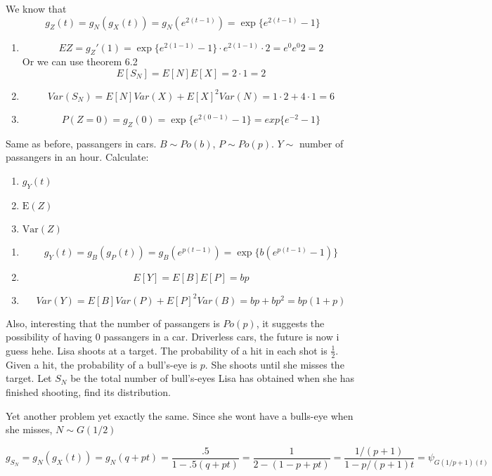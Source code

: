 \begin{enumerate}[label=(\alph*)]
\solution
We know that \[
    g_Z(t) = g_N(g_X(t)) = g_N(e^{2(t-1)}) = \exp\{e^{2(t-1)}-1\}\]

\begin{enumerate}
    \item \[EZ =  g_Z'(1) = \exp\{e^{2(1-1)}-1\} \cdot e^{2(1-1)} \cdot 2 = e^0 e^0 2 = 2
     \] Or we can use theorem 6.2
     \[
        E[S_N] = E[N] E[X] = 2\cdot1 = 2
     \]
     \item \[
        Var(S_N) = E[N]Var(X)+E[X]^2Var(N) = 1\cdot2 + 4\cdot1 = 6
     \]
     \item \[ P(Z=0) = g_Z(0) =   \exp\{e^{2(0-1)}-1\}  = exp\{e^{-2}-1\} \]
\end{enumerate}
\setcounter{problem}{25}

\problem
Same as before, passangers in cars. $B\sim Po(b)$, $P\sim Po(p)$. $Y\sim$ number of passangers in an hour. Calculate:
\begin{enumerate}
    \item \( g_Y(t) \)
    \item\( \text{E}(Z) \) 
    \item\( \text{Var}(Z) \) 
\end{enumerate}
\solution
\begin{enumerate}
    \item \[
      g_Y(t) = g_B(g_P(t)) = g_B(e^{p(t-1)}) = \exp\{b(e^{p(t-1)} - 1)\}  
    \]
    \item
     \[
        E[Y] = E[B] E[P] = bp
     \]
     \item \[
        Var(Y) = E[B]Var(P)+E[P]^2Var(B) = bp + bp^2 = bp(1+p)
     \]
\end{enumerate}
Also, interesting that the number of passangers is $Po(p)$, it suggests the possibility of having 0 passangers in a car. Driverless cars, the future is now i guess hehe.
\problem
\problem
 Lisa shoots at a target. The probability of a hit in each shot is $\frac{1}{2}$. 
 Given a hit, the probability of a bull's-eye is $p$. She shoots until she misses the target.
  Let $S_N$ be the total number of bull's-eyes Lisa has obtained when she has finished shooting,
  find its distribution.

\solution
Yet another problem yet exactly the same. Since she wont have a bulls-eye when she misses, $N \sim G(1/2)$

\[
  g_{S_N} = g_N(g_X(t)) = g_N(q+pt) = \frac{.5}{1-.5(q+pt)} = \frac{1}{2-(1-p + pt)} = \frac{1/(p+1)}{1-p/(p+1) t}  = \psi_{G(1/p+1)(t)}
\]




\end{enumerate}
